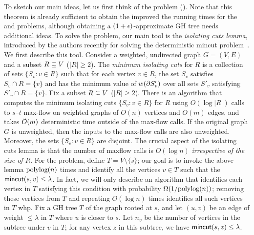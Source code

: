 To sketch our main ideas, let us first think of the \ct problem (). Note that this theorem is already sufficient to obtain the improved the running times for the \ssc and \apc problems, although obtaining a $(1+\epsilon)$-approximate GH tree needs additional ideas. To solve the \ct problem, our main tool is the {\em isolating cuts lemma}, introduced by the authors recently for solving the deterministic mincut problem~\cite{LiP20}. We first describe this tool.
%
Consider a weighted, undirected graph $G=(V,E)$ and a subset $R\subseteq V$ ($|R|\ge2$). The \emph{minimum isolating cuts} for $R$ is a collection of sets $\{S_v:v\in R\}$ such that for each vertex $v\in R$, the set $S_v$ satisfies $S_v\cap R=\{v\}$ and has the minimum value of $w(\partial S'_v)$ over all sets $S'_v$ satisfying $S'_v\cap R=\{v\}$.
\ED
%
%
Fix a subset $R\subseteq V$ ($|R|\ge2$). There is an algorithm that computes the minimum isolating cuts $\{S_v:v\in R\}$ for $R$ using $O(\log|R|)$ calls to $s$--$t$ max-flow on weighted graphs of $O(n)$ vertices and $O(m)$ edges, and takes $\tilde{O}(m)$ deterministic time outside of the max-flow calls. If the original graph $G$ is unweighted, then the inputs to the max-flow calls are also unweighted. Moreover, the sets $\{S_v:v\in R\}$ are disjoint.
\EL
%
The crucial aspect of the isolating cuts lemma is that the number of maxflow calls is $O(\log n)$ {\em irrespective of the size of $R$}. For the \ct problem, define $T= V\setminus \{s\}$; our goal is to invoke the above lemma $\textup{polylog}(n)$ times and identify all the vertices $v\in T$ such that the $\textsf{\textup{mincut}}(s, v)\le \lambda$. In fact, we will only describe an algorithm that identifies each vertex in $T$ satisfying this condition with probability $\Omega(1/\textup{polylog}(n))$; removing these vertices from $T$ and repeating $O(\log n)$ times identifies all such vertices in $T$ whp. Fix a GH tree $T$ of the graph rooted at $s$, and let $(u, v)$ be an edge of weight $\le \lambda$ in $T$ where $u$ is closer to $s$. Let $n_v$ be the number of vertices in the subtree under $v$ in $T$; for any vertex $z$ in this subtree, we have $\textsf{\textup{mincut}}(s, z) \le \lambda$.
